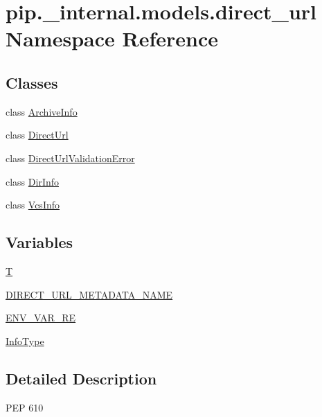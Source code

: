 \hypertarget{namespacepip_1_1__internal_1_1models_1_1direct__url}{}\section{pip.\+\_\+internal.\+models.\+direct\+\_\+url Namespace Reference}
\label{namespacepip_1_1__internal_1_1models_1_1direct__url}
\subsection*{Classes}
\begin{DoxyCompactItemize}
\item 
class \hyperlink{classpip_1_1__internal_1_1models_1_1direct__url_1_1ArchiveInfo}{Archive\+Info}
\item 
class \hyperlink{classpip_1_1__internal_1_1models_1_1direct__url_1_1DirectUrl}{Direct\+Url}
\item 
class \hyperlink{classpip_1_1__internal_1_1models_1_1direct__url_1_1DirectUrlValidationError}{Direct\+Url\+Validation\+Error}
\item 
class \hyperlink{classpip_1_1__internal_1_1models_1_1direct__url_1_1DirInfo}{Dir\+Info}
\item 
class \hyperlink{classpip_1_1__internal_1_1models_1_1direct__url_1_1VcsInfo}{Vcs\+Info}
\end{DoxyCompactItemize}
\subsection*{Variables}
\begin{DoxyCompactItemize}
\item 
\hyperlink{namespacepip_1_1__internal_1_1models_1_1direct__url_a13ec100096d1304624926be2d82dce7c}{T}
\item 
\hyperlink{namespacepip_1_1__internal_1_1models_1_1direct__url_a05b256a10578a1f225c866bf6f17e238}{D\+I\+R\+E\+C\+T\+\_\+\+U\+R\+L\+\_\+\+M\+E\+T\+A\+D\+A\+T\+A\+\_\+\+N\+A\+ME}
\item 
\hyperlink{namespacepip_1_1__internal_1_1models_1_1direct__url_afd37aa9d87fd2a3ecf9ee158693e98e6}{E\+N\+V\+\_\+\+V\+A\+R\+\_\+\+RE}
\item 
\hyperlink{namespacepip_1_1__internal_1_1models_1_1direct__url_a844c1d615f2cd943e2b0e207efe042c5}{Info\+Type}
\end{DoxyCompactItemize}


\subsection{Detailed Description}
\begin{DoxyVerb}PEP 610 \end{DoxyVerb}
 

